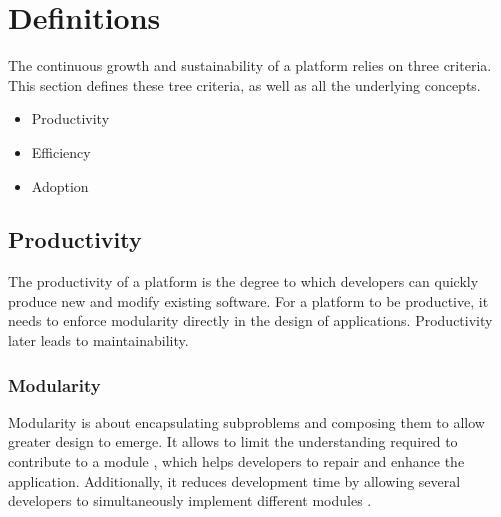 \section{Definitions} \label{chapter3:definitions}

The continuous growth and sustainability of a platform relies on three criteria.
This section defines these tree criteria, as well as all the underlying concepts.


\begin{itemize}
\item Productivity
\item Efficiency
\item Adoption
\end{itemize}

\subsection{Productivity} \label{chapter3:definitions:productivity}

The productivity of a platform is the degree to which developers can quickly produce new and modify existing software.
For a platform to be productive, it needs to enforce modularity directly in the design of applications.
Productivity later leads to maintainability.

\subsubsection{Modularity} \label{chapter3:definitions:productivity:modularity}

Modularity is about encapsulating subproblems and composing them to allow greater design to emerge.
It allows to limit the understanding required to contribute to a module \cite{Stevens1974}, which helps developers to repair and enhance the application. 
Additionally, it reduces development time by allowing several developers to simultaneously implement different modules \cite{Wong2009,Cataldo2006}.

